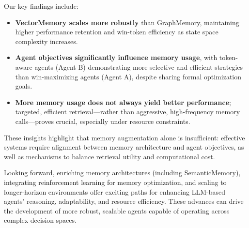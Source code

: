 \documentclass[10pt]{article}
\begin{document}
Our key findings include:

\begin{itemize}[leftmargin=*,nosep]
\item \textbf{VectorMemory scales more robustly} than GraphMemory, maintaining higher performance retention and win-token efficiency as state space complexity increases.
\item \textbf{Agent objectives significantly influence memory usage}, with token-aware agents (Agent B) demonstrating more selective and efficient strategies than win-maximizing agents (Agent A), despite sharing formal optimization goals.
\item \textbf{More memory usage does not always yield better performance}; targeted, efficient retrieval—rather than aggressive, high-frequency memory calls—proves crucial, especially under resource constraints.
\end{itemize}

These insights highlight that memory augmentation alone is insufficient: effective systems require alignment between memory architecture and agent objectives, as well as mechanisms to balance retrieval utility and computational cost.

Looking forward, enriching memory architectures (including SemanticMemory), integrating reinforcement learning for memory optimization, and scaling to longer-horizon environments offer exciting paths for enhancing LLM-based agents' reasoning, adaptability, and resource efficiency. These advances can drive the development of more robust, scalable agents capable of operating across complex decision spaces.



\end{document}
